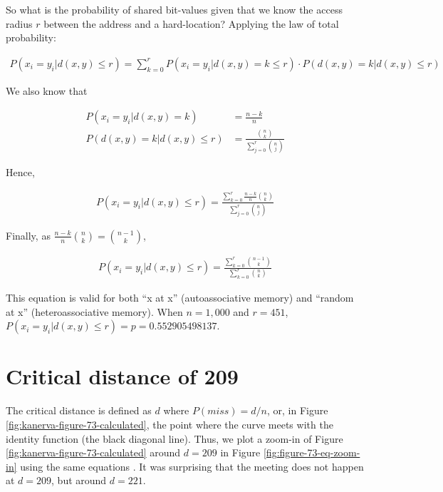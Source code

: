 So what is the probability of shared bit-values given that we know the access radius $r$ between the address and a hard-location?  Applying the law of total probability:

\begin{align}
P(x_i = y_i | d(x, y) \le r) = \sum_{k=0}^{r} P(x_i = y_i | d(x, y) = k \le r) \cdot P(d(x, y) = k | d(x, y) \le r)
\end{align}

We also know that

\begin{align}
P(x_i = y_i | d(x, y) = k) &= \frac{n-k}{n} \\
P(d(x, y) = k | d(x, y) \le r) &= \frac{\binom{n}{k}}{\sum_{j=0}^{r} \binom{n}{j}}
\end{align}

Hence,

\begin{align}
P(x_i = y_i | d(x, y) \le r) = \frac{\sum_{k=0}^{r} \frac{n-k}{n} \binom{n}{k}}{\sum_{j=0}^{r} \binom{n}{j}}
\end{align}

Finally, as $\frac{n-k}{n} \binom{n}{k} = \binom{n-1}{k}$,

\begin{align}
P(x_i = y_i | d(x, y) \le r) = \frac{\sum_{k=0}^{r} \binom{n-1}{k}}{\sum_{k=0}^{r} \binom{n}{k}}
\end{align}

This equation is valid for both ``x at x'' (autoassociative memory) and ``random at x'' (heteroassociative memory). When $n=1,000$ and $r=451$, $P(x_i = y_i | d(x, y) \le r) = p = 0.552905498137$.





\section{Critical distance of 209}

The critical distance is defined as $d$ where $P(miss) = d/n$, or, in Figure \ref{fig:kanerva-figure-73-calculated}, the point where the curve meets with the identity function (the black diagonal line). Thus, we plot a zoom-in of Figure \ref{fig:kanerva-figure-73-calculated} around $d=209$ in Figure \ref{fig:figure-73-eq-zoom-in} using the same equations \citep{brogliato2014sparse}. It was surprising that the meeting does not happen at $d=209$, but around $d=221$.

